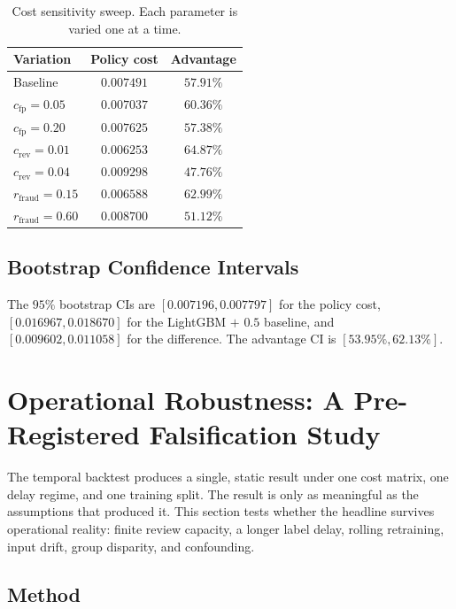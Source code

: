 \documentclass[conference]{IEEEtran}
\begin{document}
\begin{table}[!t]
\caption{Cost sensitivity sweep. Each parameter is varied one at a time.}
\label{tab:sens}
\centering
\small
\begin{tabular}{lcc}
\toprule
Variation & Policy cost & Advantage \\
\midrule
Baseline                          & $0.007491$ & $57.91\%$ \\
$c_{\text{fp}} = 0.05$            & $0.007037$ & $60.36\%$ \\
$c_{\text{fp}} = 0.20$            & $0.007625$ & $57.38\%$ \\
$c_{\text{rev}} = 0.01$           & $0.006253$ & $64.87\%$ \\
$c_{\text{rev}} = 0.04$           & $0.009298$ & $47.76\%$ \\
$r_{\text{fraud}} = 0.15$         & $0.006588$ & $62.99\%$ \\
$r_{\text{fraud}} = 0.60$         & $0.008700$ & $51.12\%$ \\
\bottomrule
\end{tabular}
\end{table}

\subsection{Bootstrap Confidence Intervals}

The $95\%$ bootstrap CIs are $[0.007196, 0.007797]$ for the policy cost,
$[0.016967, 0.018670]$ for the LightGBM $+$ $0.5$ baseline, and
$[0.009602, 0.011058]$ for the difference. The advantage CI is
$[53.95\%, 62.13\%]$.

\section{Operational Robustness: A Pre-Registered Falsification Study}
\label{sec:robust}

The temporal backtest produces a single, static result under one cost
matrix, one delay regime, and one training split. The result is only as
meaningful as the assumptions that produced it. This section tests whether
the headline survives operational reality: finite review capacity, a longer
label delay, rolling retraining, input drift, group disparity, and
confounding.

\subsection{Method}
\end{document}
